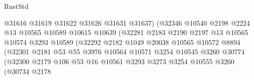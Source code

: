 \begin{lexlean}{RustStd}
\begin{coremodule}
                                      @31616
                                      @31619
                                      @31622
                                      @31626
                                      @31631
                                      @31637)
                                    (@32346
                                      @10540
                                      @2198
                                      @2224
                                      @13
                                      @10565
                                      @10589
                                      @10615
                                      @10639
                                      (@32281
                                        @2183
                                        @2190
                                        @2197
                                        @13
                                        @10565
                                        @10574
                                        @3293
                                        @10589
                                        (@32292
                                          @2182
                                          @1049
                                          @20038
                                          @10565
                                          @10572
                                          @8894
                                          (@32301
                                            @2181
                                            @53
                                            @55
                                            @3976
                                            @10564
                                            @10571
                                            @3254
                                            @10545
                                            @3260
                                            @30774
                                            (@32300
                                              @2179
                                              @106
                                              @53
                                              @16
                                              @10561
                                              @3293
                                              @3273
                                              @3254
                                              @10555
                                              @3260
                                              (@30734
                                                @2178

\end{coremodule}
\end{lexlean}

